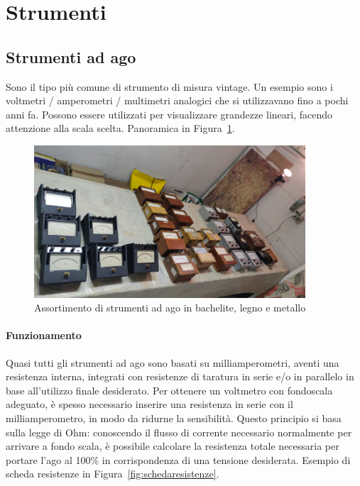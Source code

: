 \documentclass[12pt,a4paper]{report}
\begin{document}
\section{Strumenti}
\subsection{Strumenti ad ago}
Sono il tipo più comune di strumento di misura vintage. Un esempio sono i voltmetri / amperometri / multimetri analogici che si utilizzavano
fino a pochi anni fa. Possono essere utilizzati per visualizzare grandezze lineari, facendo attenzione alla scala scelta.
Panoramica in Figura~\ref{fig:strumentiago}.
\begin{figure}[h]
  \centering
  \includegraphics[width=0.9\textwidth]{strumentiago}
  \caption{Assortimento di strumenti ad ago in bachelite, legno e metallo}
  \label{fig:strumentiago}
\end{figure}

\paragraph{Funzionamento}
Quasi tutti gli strumenti ad ago sono basati su milliamperometri, aventi una resistenza interna, integrati con resistenze di taratura
in serie e/o in parallelo in base all'utilizzo finale desiderato. Per ottenere un voltmetro con fondoscala adeguato, è spesso necessario
inserire una resistenza in serie con il milliamperometro, in modo da ridurne la sensibilità.
Questo principio si basa sulla legge di Ohm: conoscendo il flusso di corrente necessario normalmente per arrivare a fondo scala, è
possibile calcolare la resistenza totale necessaria per portare l'ago al 100\% in corrispondenza di una tensione desiderata.
Esempio di scheda resistenze in Figura~\ref{fig:schedaresistenze}.
\end{document}
